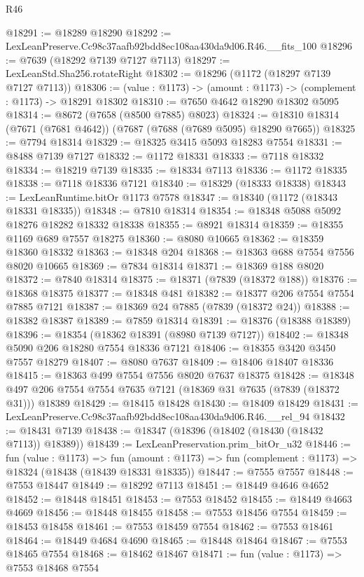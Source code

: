 \begin{lexlean}{R46}
\begin{coremodule}
@18291 := @18289 @18290
@18292 := LexLeanPreserve.Cc98c37aafb92bdd8ec108aa430da9d06.R46.__fits_100
@18296 := @7639 (@18292 @7139 @7127 @7113)
@18297 := LexLeanStd.Sha256.rotateRight
@18302 := @18296 (@1172 (@18297 @7139 @7127 @7113))
@18306 := (value : @1173) -> (amount : @1173) -> (complement : @1173) -> @18291 @18302
@18310 := @7650 @4642 @18290 @18302 @5095
@18314 := @8672 (@7658 (@8500 @7885) @8023)
@18324 := @18310 @18314 (@7671 (@7681 @4642)) (@7687 (@7688 (@7689 @5095) @18290 @7665))
@18325 := @7794 @18314
@18329 := @18325 @3415 @5093 @18283 @7554
@18331 := @8488 @7139 @7127
@18332 := @1172 @18331
@18333 := @7118 @18332
@18334 := @18219 @7139
@18335 := @18334 @7113
@18336 := @1172 @18335
@18338 := @7118 @18336 @7121
@18340 := @18329 (@18333 @18338)
@18343 := LexLeanRuntime.bitOr @1173 @7578
@18347 := @18340 (@1172 (@18343 @18331 @18335))
@18348 := @7810 @18314
@18354 := @18348 @5088 @5092 @18276 @18282 @18332 @18338
@18355 := @8921 @18314
@18359 := @18355 @1169 @689 @7557 @18275
@18360 := @8080 @10665
@18362 := @18359 @18360 @18332
@18363 := @18348 @204
@18368 := @18363 @688 @7554 @7556 @8020 @10665
@18369 := @7834 @18314
@18371 := @18369 @188 @8020
@18372 := @7840 @18314
@18375 := @18371 (@7839 (@18372 @188))
@18376 := @18368 @18375
@18377 := @18348 @481
@18382 := @18377 @206 @7554 @7554 @7885 @7121
@18387 := @18369 @24 @7885 (@7839 (@18372 @24))
@18388 := @18382 @18387
@18389 := @7859 @18314
@18391 := @18376 (@18388 @18389)
@18396 := @18354 (@18362 @18391 (@8980 @7139 @7127))
@18402 := @18348 @5090 @206 @18280 @7554 @18336 @7121
@18406 := @18355 @3420 @3450 @7557 @18279
@18407 := @8080 @7637
@18409 := @18406 @18407 @18336
@18415 := @18363 @499 @7554 @7556 @8020 @7637 @18375
@18428 := @18348 @497 @206 @7554 @7554 @7635 @7121 (@18369 @31 @7635 (@7839 (@18372 @31))) @18389
@18429 := @18415 @18428
@18430 := @18409 @18429
@18431 := LexLeanPreserve.Cc98c37aafb92bdd8ec108aa430da9d06.R46.__rel_94
@18432 := @18431 @7139
@18438 := @18347 (@18396 (@18402 (@18430 (@18432 @7113)) @18389))
@18439 := LexLeanPreservation.prim_bitOr_u32
@18446 := fun (value : @1173) =>
  fun (amount : @1173) => fun (complement : @1173) => @18324 (@18438 (@18439 @18331 @18335))
@18447 := @7555 @7557
@18448 := @7553 @18447
@18449 := @18292 @7113
@18451 := @18449 @4646 @4652
@18452 := @18448 @18451
@18453 := @7553 @18452
@18455 := @18449 @4663 @4669
@18456 := @18448 @18455
@18458 := @7553 @18456 @7554
@18459 := @18453 @18458
@18461 := @7553 @18459 @7554
@18462 := @7553 @18461
@18464 := @18449 @4684 @4690
@18465 := @18448 @18464
@18467 := @7553 @18465 @7554
@18468 := @18462 @18467
@18471 := fun (value : @1173) => @7553 @18468 @7554

\end{coremodule}
\end{lexlean}
